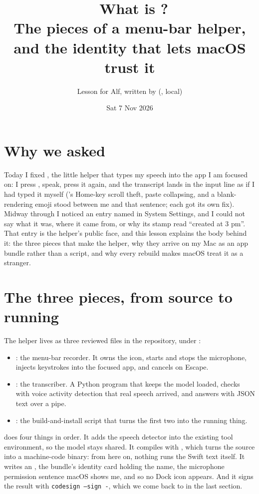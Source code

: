 \documentclass[11pt,a4paper]{article}
\title{\emo{studio microphone}\ What is \name{Whisper Dictation}?\\[0.3em]
  \large The pieces of a menu-bar helper, and the identity that lets macOS trust it}
\author{Lesson for Alf, written by \name{OpenCode} (\name{Qwen3.8 Flash-Next}, local)}
\date{Sat 7 Nov 2026}
\newcommand{\chord}{\keys{{\glyphSF\symbol{"2303}},{\glyphSF\symbol{"2325}},D}}  %
\begin{document}
\maketitle

\section*{Why we asked}

Today I fixed , the little helper that types my speech into the app I am focused on: I press \chord, speak, press it again, and the transcript lands in the input line as if I had typed it myself ('s Home-key scroll theft, paste collapsing, and a blank-rendering emoji stood between me and that sentence; each got its own fix). Midway through I noticed an entry named  in System Settings, and I could not say what it was, where it came from, or why its stamp read ``created at 3 pm''. That entry is the helper's public face, and this lesson explains the body behind it: the three pieces that make the helper, why they arrive on my Mac as an app bundle rather than a script, and why every rebuild makes macOS treat it as a stranger.

\section{The three pieces, from source to running}

The helper lives as three reviewed files in the  repository, under :

\begin{itemize}[leftmargin=2em]
  \item {}: the menu-bar recorder. It owns the icon, starts and stops the microphone, injects keystrokes into the focused app, and cancels on Escape.
  \item {}: the transcriber. A Python program that keeps the  model loaded, checks with voice activity detection that real speech arrived, and answers with JSON text over a pipe.
  \item {}: the build-and-install script that turns the first two into the running thing.
\end{itemize}

 does four things in order. It adds the  speech detector into the existing   tool environment, so the model stays shared. It compiles  with , which turns the source into a machine-code binary: from here on, nothing runs the Swift text itself. It writes an , the bundle's identity card holding the name, the microphone permission sentence macOS shows me, and  so no Dock icon appears. And it signs the result with \texttt{codesign --sign -}, which we come back to in the last section.
\end{document}
